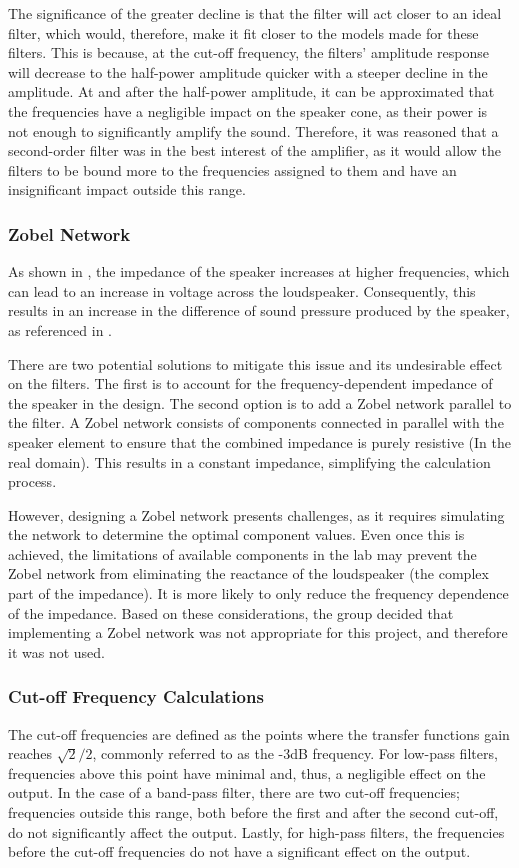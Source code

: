 The significance of the greater decline is that the filter will act closer to an ideal filter, which would, therefore, make it fit closer to the models made for these filters. This is because, at the cut-off frequency, the filters' amplitude response will decrease to the half-power amplitude quicker with a steeper decline in the amplitude. At and after the half-power amplitude, it can be approximated that the frequencies have a negligible impact on the speaker cone, as their power is not enough to significantly amplify the sound. Therefore, it was reasoned that a second-order filter was in the best interest of the amplifier, as it would allow the filters to be bound more to the frequencies assigned to them and have an insignificant impact outside this range. 

\subsubsection{Zobel Network}
As shown in , the impedance of the speaker increases at higher frequencies, which can lead to an increase in voltage across the loudspeaker. Consequently, this results in an increase in the difference of sound pressure produced by the speaker, as referenced in \cite{IP-manual}.

There are two potential solutions to mitigate this issue and its undesirable effect on the filters. The first is to account for the frequency-dependent impedance of the speaker in the design. The second option is to add a Zobel network parallel to the filter. A Zobel network consists of components connected in parallel with the speaker element to ensure that the combined impedance is purely resistive (In the real domain). This results in a constant impedance, simplifying the calculation process.

However, designing a Zobel network presents challenges, as it requires simulating the network to determine the optimal component values. Even once this is achieved, the limitations of available components in the lab may prevent the Zobel network from eliminating the reactance of the loudspeaker (the complex part of the impedance). It is more likely to only reduce the frequency dependence of the impedance. Based on these considerations, the group decided that implementing a Zobel network was not appropriate for this project, and therefore it was not used.

\subsubsection{Cut-off Frequency Calculations}
The cut-off frequencies are defined as the points where the transfer functions gain reaches $\sqrt{2}/2$, commonly referred to as the -3dB frequency. For low-pass filters, frequencies above this point have minimal and, thus, a negligible effect on the output. In the case of a band-pass filter, there are two cut-off frequencies; frequencies outside this range, both before the first and after the second cut-off, do not significantly affect the output. Lastly, for high-pass filters, the frequencies before the cut-off frequencies do not have a significant effect on the output.

